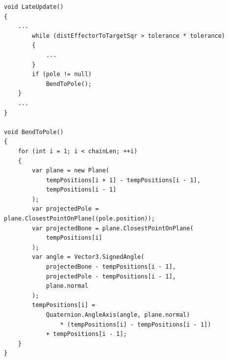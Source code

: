 \begin{lstlisting}[basicstyle=\footnotesize, numbers=none,frame=single,
caption={Pole target constraint},captionpos=b, label=poles, language={[Sharp]c}]
void LateUpdate()
{
    ...
        while (distEffectorToTargetSqr > tolerance * tolerance)
        {
            ...
        }
        if (pole != null)
            BendToPole();
    }
    ...
}

void BendToPole()
{
    for (int i = 1; i < chainLen; ++i)
    {
        var plane = new Plane(
            tempPositions[i + 1] - tempPositions[i - 1],
            tempPositions[i - 1]
        );
        var projectedPole = plane.ClosestPointOnPlane((pole.position));
        var projectedBone = plane.ClosestPointOnPlane(
            tempPositions[i]
        );
        var angle = Vector3.SignedAngle(
            projectedBone - tempPositions[i - 1],
            projectedPole - tempPositions[i - 1],
            plane.normal
        );
        tempPositions[i] =
            Quaternion.AngleAxis(angle, plane.normal)
                * (tempPositions[i] - tempPositions[i - 1])
            + tempPositions[i - 1];
    }
}
\end{lstlisting}


